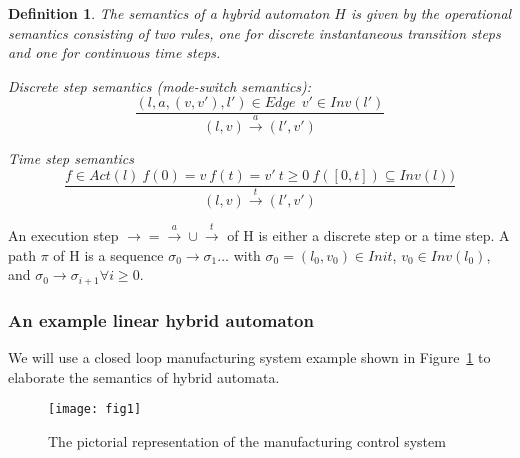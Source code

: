 \documentclass[10pt,journal,cspaper,compsoc]{IEEEtran}
\newtheorem{definition}{Definition}
\begin{document}
\begin{definition}
  The semantics of a hybrid automaton $H$ is given by the operational
  semantics consisting of two rules, one for discrete instantaneous
  transition steps and one for continuous time steps.
  
  \begin{compactitem}
   
  \item Discrete step semantics (mode-switch semantics):
    \[
    \frac{(l,a,(v,v'),l') \in Edge\ \  v' \in Inv(l')}{(l,v) \xrightarrow{a} (l',v')}
    \]
  
\item Time step semantics
    \[
    \frac{f\in Act(l)\ f(0)=v\ f(t)=v'\ t\geq 0\ f([0,t])
      \subseteq Inv(l))}{(l,v) \xrightarrow{t} (l',v')}
    \]
  \end{compactitem}
\end{definition}

An execution step $\rightarrow = \xrightarrow{a} \cup \xrightarrow{t}$
of H is either a discrete step or a time step. A path $\pi$ of H is a
sequence $\sigma_0 \rightarrow \sigma_1 \ldots$ with
$\sigma_0 = (l_0,v_0) \in Init$, $v_0 \in Inv(l_0)$, and
$\sigma_0 \rightarrow \sigma_{i+1} \forall i \geq 0$.

\subsubsection{An example linear hybrid automaton}
\label{sec:an-example-linear-1}

We will use a closed loop manufacturing system example shown in
Figure~\ref{fig:1} to elaborate the semantics of hybrid automata.

\begin{figure}[t!]
  \centering
  \texttt{[image: fig1]} 
  \caption{The pictorial representation of the manufacturing
  control system}
  \label{fig:1}
\end{figure}
\end{document}
